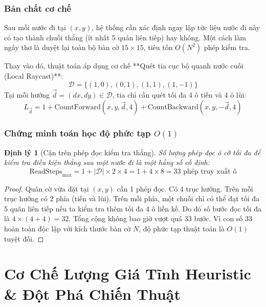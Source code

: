 \documentclass[11pt,a4paper]{report}
\newtheorem{theorem}{Định lý}[chapter]
\begin{document}
\subsection{Bản chất cơ chế}
Sau mỗi nước đi tại $(x, y)$, hệ thống cần xác định ngay lập tức liệu nước đi này có tạo thành chuỗi thắng (ít nhất 5 quân liên tiếp) hay không. Một cách làm ngây thơ là duyệt lại toàn bộ bàn cờ $15 \times 15$, tiêu tốn $O(N^2)$ phép kiểm tra.

Thay vào đó, thuật toán áp dụng cơ chế **Quét tia cục bộ quanh nước cuối (Local Raycast)**:
\begin{equation}
    \mathcal{D} = \{(1, 0), (0, 1), (1, 1), (1, -1)\}
\end{equation}
Tại mỗi hướng $\vec{d} = (dx, dy) \in \mathcal{D}$, tia chỉ cần quét tối đa 4 ô tiến và 4 ô lùi:
\begin{equation}
    L_{\vec{d}} = 1 + \text{CountForward}(x, y, \vec{d}, 4) + \text{CountBackward}(x, y, -\vec{d}, 4)
\end{equation}

\subsection{Chứng minh toán học độ phức tạp $O(1)$}
\begin{theorem}[Cận trên phép đọc kiểm tra thắng]
Số lượng phép đọc ô cờ tối đa để kiểm tra điều kiện thắng sau một nước đi là một hằng số cố định:
\begin{equation}
    \text{ReadSteps}_{\max} = 1 + |\mathcal{D}| \times 2 \times 4 = 1 + 4 \times 8 = 33 \text{ phép truy xuất ô}
\end{equation}
\end{theorem}
\begin{proof}
Quân cờ vừa đặt tại $(x, y)$ cần 1 phép đọc. Có 4 trục hướng. Trên mỗi trục hướng có 2 phía (tiến và lùi). Trên mỗi phía, một chuỗi chỉ có thể đạt tối đa 5 quân liên tiếp nếu ta kiểm tra thêm tối đa 4 ô liền kề. Do đó số bước đọc tối đa là $4 \times (4 + 4) = 32$. Tổng cộng không bao giờ vượt quá 33 bước. Vì con số 33 hoàn toàn độc lập với kích thước bàn cờ $N$, độ phức tạp thuật toán là $O(1)$ tuyệt đối.
\end{proof}

\chapter{Cơ Chế Lượng Giá Tĩnh Heuristic \& Đột Phá Chiến Thuật}
\end{document}
